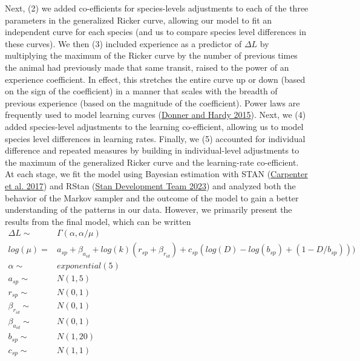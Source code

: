 \documentclass[twoside,12pt,final]{ucthesis-CA2012}
\begin{document}
\begin{ucmainmatter}
Next, (2) we added co-efficients for species-levels adjustments to each of the three parameters in the generalized Ricker curve, allowing our model to fit an independent curve for each species (and us to compare species level differences in these curves). We then (3) included experience as a predictor of \(\Delta L\) by multiplying the maximum of the Ricker curve by the number of previous times the animal had previously made that same transit, raised to the power of an experience coefficient. In effect, this stretches the entire curve up or down (based on the sign of the coefficient) in a manner that scales with the breadth of previous experience (based on the magnitude of the coefficient). Power laws are frequently used to model learning curves (\protect\hyperlink{ref-donner2015}{Donner and Hardy 2015}). Next, we (4) added species-level adjustments to the learning co-efficient, allowing us to model species level differences in learning rates. Finally, we (5) accounted for individual difference and repeated measures by building in individual-level adjustments to the maximum of the generalized Ricker curve and the learning-rate co-efficient. At each stage, we fit the model using Bayesian estimation with STAN (\protect\hyperlink{ref-carpenter2017stan}{Carpenter et al. 2017}) and RStan (\protect\hyperlink{ref-standevelopmentteam2023}{Stan Development Team 2023}) and analyzed both the behavior of the Markov sampler and the outcome of the model to gain a better understanding of the patterns in our data. However, we primarily present the results from the final model, which can be written
\begin{align*}
\Delta L \sim & \Gamma (\alpha, \alpha/\mu) \\
log(\mu) = & a_{sp} +\beta_{a_{id}} + log(k)(r_{sp} + \beta_{r_{id}}) + c_{sp} (log(D) - log(b_{sp}) + (1 - D/b_{sp}))) \\
\alpha \sim & exponential(5)\\
a_{sp} \sim & N(1, 5) \\
r_{sp} \sim & N(0,1) \\
\beta_{r_{id}} \sim & N(0,1)  \\
\beta_{a_{id}} \sim & N(0, 1) \\
b_{sp} \sim & N(1, 20) \\
c_{sp} \sim & N(1,1)
\end{align*}

\end{ucmainmatter}
\end{document}
